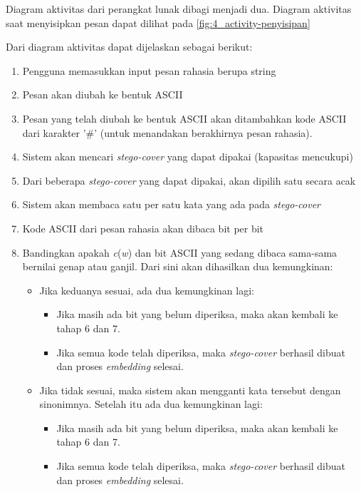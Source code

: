 Diagram aktivitas dari perangkat lunak dibagi menjadi dua. Diagram aktivitas saat menyisipkan pesan dapat dilihat pada \ref{fig:4_activity-penyisipan}

Dari diagram aktivitas dapat dijelaskan sebagai berikut:

\begin{enumerate}
	\item Pengguna memasukkan input pesan rahasia berupa string
	\item Pesan akan diubah ke bentuk ASCII
	\item Pesan yang telah diubah ke bentuk ASCII akan ditambahkan kode ASCII dari karakter '\#' (untuk menandakan berakhirnya pesan rahasia).
	\item Sistem akan mencari \textit{stego-cover} yang dapat dipakai (kapasitas mencukupi)
	\item Dari beberapa \textit{stego-cover} yang dapat dipakai, akan dipilih satu secara acak
	\item Sistem akan membaca satu per satu kata yang ada pada \textit{stego-cover}
	\item Kode ASCII dari pesan rahasia akan dibaca bit per bit
	\item Bandingkan apakah \textit{c}(\textit{w}) dan bit ASCII yang sedang dibaca sama-sama bernilai genap atau ganjil. Dari sini akan dihasilkan dua kemungkinan:
	\begin{itemize}
		\item Jika keduanya sesuai, ada dua kemungkinan lagi:
		\begin{itemize}
			\item Jika masih ada bit yang belum diperiksa, maka akan kembali ke tahap 6 dan 7.
			\item Jika semua kode telah diperiksa, maka \textit{stego-cover} berhasil dibuat dan proses \textit{embedding} selesai.
		\end{itemize}
		\item Jika tidak sesuai, maka sistem akan mengganti kata tersebut dengan sinonimnya. Setelah itu ada dua kemungkinan lagi:
		\begin{itemize}
			\item Jika masih ada bit yang belum diperiksa, maka akan kembali ke tahap 6 dan 7.
			\item Jika semua kode telah diperiksa, maka \textit{stego-cover} berhasil dibuat dan proses \textit{embedding} selesai.
		\end{itemize}
	\end{itemize}
\end{enumerate}

